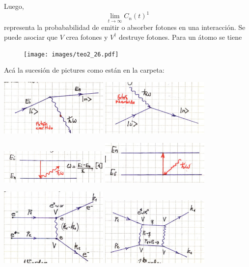 \documentclass[10pt,oneside]{CBFT_book}
\begin{document}
Luego,
\[
	\lim_{t\to\infty} C_n(t)^1
\]
representa la probababilidad de emitir o absorber fotones en una interacción. Se puede asociar que $V$ crea 
fotones y $V^\dagger$ destruye fotones. Para un átomo se tiene 
\begin{figure}[htb]
	\begin{center}
	\texttt{[image: images/teo2\_26.pdf]}
	\end{center}
	\caption{}
\end{figure} 


Acá la sucesión de pictures como están en la carpeta:

\includegraphics[width=0.4\textwidth]{images/fig_ft2_perturbativos_1a.jpg}
\includegraphics[width=0.4\textwidth]{images/fig_ft2_perturbativos_1b.jpg}

\includegraphics[width=0.4\textwidth]{images/fig_ft2_perturbativos_2a.jpg}
\includegraphics[width=0.4\textwidth]{images/fig_ft2_perturbativos_2b.jpg}

\includegraphics[width=0.4\textwidth]{images/fig_ft2_perturbativos_3a.jpg}
\includegraphics[width=0.4\textwidth]{images/fig_ft2_perturbativos_3b.jpg}
\end{document}

